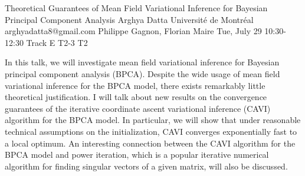 \begin{talk}
  {Theoretical Guarantees of Mean Field Variational Inference for Bayesian Principal Component Analysis}%
  {Arghya Datta}%
  {Université de Montréal}%
  {arghyadatta8@gmail.com}%
  {Philippe Gagnon, Florian Maire}%
  {}%
  {Tue, July 29 10:30-12:30 Track E}%
  {T2-3}%
  {T2}%
			
In this talk, we will investigate mean field variational inference for Bayesian principal component analysis (BPCA). Despite the wide usage of mean field variational inference for the BPCA model, there exists remarkably little theoretical justification. I will talk about new results on the convergence guarantees of the iterative coordinate ascent variational inference (CAVI) algorithm for the BPCA model. In particular, we will show that under reasonable technical assumptions on the initialization, CAVI converges exponentially fast to a local optimum. An interesting connection between the CAVI algorithm for the BPCA model and power iteration, which is a popular iterative numerical algorithm for finding singular vectors of a given matrix, will also be discussed.


\end{talk}
